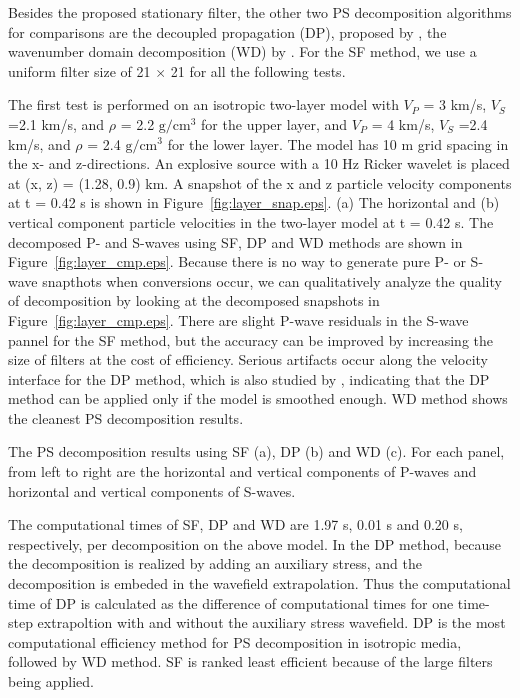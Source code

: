 \documentclass[manuscript,ulem,graphix,revised]{geophysics}
\begin{document}
Besides the proposed stationary filter, the other two PS decomposition algorithms for comparisons are the decoupled propagation (DP), proposed by \citet{ma03}, the wavenumber domain decomposition (WD) by \citet{zhang10}. For the SF method, we use a uniform filter size of 21 $\times$ 21 for all the following tests.

The first test is performed on an isotropic two-layer model with $V_P$ = 3 km/s, $V_S$ =2.1 km/s, and $\rho$ = 2.2 $\mathrm{g/cm^3}$ for the upper layer, and $V_P$ = 4 km/s, $V_S$ =2.4 km/s, and $\rho$ = 2.4 $\mathrm{g/cm^3}$ for the lower layer. 
The model has 10 m grid spacing in the x- and z-directions. An explosive source with a 10 Hz Ricker wavelet is placed at (x, z) = (1.28, 0.9) km. A snapshot of the x and z particle velocity components at t = 0.42 s is shown in Figure~\ref{fig:layer_snap.eps}.
{
(a) The horizontal and (b) vertical component particle velocities in the two-layer model at t = 0.42 s.
}
The decomposed P- and S-waves using SF, DP and WD methods are shown in Figure~\ref{fig:layer_cmp.eps}. Because there is no way to generate pure P- or S-wave snapthots when conversions occur, we can qualitatively analyze the quality of decomposition by looking at the decomposed snapshots in Figure~\ref{fig:layer_cmp.eps}. There are slight P-wave residuals in the S-wave pannel for the SF method, but the accuracy can be improved by increasing the size of filters at the cost of efficiency. Serious artifacts occur along the velocity interface for the DP method, which is also studied by \citet{wenlong_cmp15}, indicating that the DP method can be applied only if the model is smoothed enough. WD method shows the cleanest PS decomposition results. 

{
The PS decomposition results using SF (a), DP (b) and WD (c). For each panel, from left to right are the horizontal and vertical components of P-waves and horizontal and vertical components of S-waves.
}

The computational times of SF, DP and WD are 1.97 s, 0.01 s and 0.20 s, respectively, per decomposition on the above model. In the DP method, because the decomposition is realized by adding an auxiliary stress, and the decomposition is embeded in the wavefield extrapolation. Thus the computational time of DP is calculated as the difference of computational times for one time-step extrapoltion with and without the auxiliary stress wavefield. DP is the most computational efficiency method for PS decomposition in isotropic media, followed by WD method. SF is ranked least efficient because of the large filters being applied.
\end{document}
